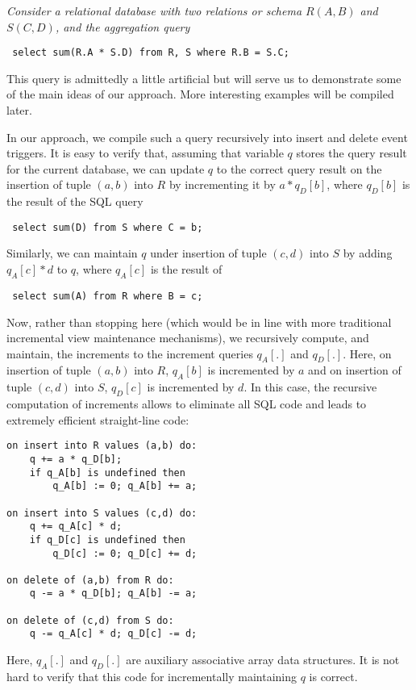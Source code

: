 \begin{example}\em Consider a relational database with two relations or schema
$R(A,B)$ and $S(C,D)$, and the aggregation query
\begin{verbatim} select sum(R.A * S.D) from R, S where R.B = S.C;
\end{verbatim} This query is admittedly a little artificial but will serve us to
demonstrate some of the main ideas of our approach. More interesting examples
will be compiled later.

In our approach, we compile such a query recursively into insert and delete
event triggers.  It is easy to verify that, assuming that variable $q$ stores
the query result for the current database, we can update $q$ to the correct
query result on the insertion of tuple $(a,b)$ into $R$ by incrementing it by $a
* q_D[b]$, where $q_D[b]$ is the result of the SQL query
\begin{verbatim} select sum(D) from S where C = b;
\end{verbatim} Similarly, we can maintain $q$ under insertion of tuple $(c,d)$
into $S$ by adding $q_A[c] * d$ to $q$, where $q_A[c]$ is the result of
\begin{verbatim} select sum(A) from R where B = c;
\end{verbatim} Now, rather than stopping here (which would be in line with more
traditional incremental view maintenance mechanisms), we recursively compute,
and maintain, the increments to the increment queries $q_A[.]$ and $q_D[.]$.
Here, on insertion of tuple $(a,b)$ into $R$, $q_A[b]$ is incremented by $a$ and
on insertion of tuple $(c,d)$ into $S$, $q_D[c]$ is incremented by $d$.  In this
case, the recursive computation of increments allows to eliminate all SQL code
and leads to extremely efficient straight-line code:
\begin{Verbatim}
on insert into R values (a,b) do:
    q += a * q_D[b];
    if q_A[b] is undefined then
        q_A[b] := 0; q_A[b] += a;

on insert into S values (c,d) do:
    q += q_A[c] * d;
    if q_D[c] is undefined then
        q_D[c] := 0; q_D[c] += d;

on delete of (a,b) from R do:
    q -= a * q_D[b]; q_A[b] -= a;

on delete of (c,d) from S do:
    q -= q_A[c] * d; q_D[c] -= d;
\end{Verbatim}

Here, $q_A[.]$ and $q_D[.]$ are auxiliary associative array data
structures.  It is not hard to verify that this code for incrementally
maintaining $q$ is correct.


\end{example}
